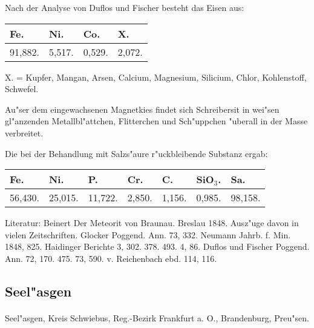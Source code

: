 \documentclass[a4paper, 11pt, oneside]{article}
\begin{document}
Nach der Analyse von Duflos und Fischer besteht das Eisen aus:
\begin{table}[H]
    \centering
    \begin{tabular}{l l l l}
        Fe. & Ni. & Co. & X. \\ \hline
        91,882. & 5,517. & 0,529. & 2,072. \\
    \end{tabular}
\end{table}

X. = Kupfer, Mangan, Arsen, Calcium, Magnesium, Silicium, Chlor, Kohlenstoff, Schwefel.

Au"ser dem eingewachsenen Magnetkies findet sich Schreibersit in wei"sen gl"anzenden Metallbl"attchen, Flitterchen und Sch"uppchen "uberall in der Masse verbreitet.

Die bei der Behandlung mit Salzs"aure r"uckbleibende Substanz ergab:
\begin{table}[H]
    \centering
    \begin{tabular}{l l l l l l l}
        Fe. & Ni. & P. & Cr. & C. & SiO$_{3}$. & Sa. \\ \hline
        56,430. & 25,015. & 11,722. & 2,850. & 1,156. & 0,985. & 98,158. \\
    \end{tabular}
\end{table}

\footnotesize
Literatur: Beinert Der Meteorit von Braunau. Breslau 1848. Ausz"uge davon in vielen Zeitschriften. Glocker Poggend. Ann. 73, 332. Neumann Jahrb. f. Min. 1848, 825. Haidinger Berichte 3, 302. 378. 493. 4, 86. Duflos und Fischer Poggend. Ann. 72, 170. 475. 73, 590. v. Reichenbach ebd. 114, 116.

\subsection{Seel"asgen}
\normalsize
\paragraph{}
Seel"asgen, Kreis Schwiebus, Reg.-Bezirk Frankfurt a. O., Brandenburg, Preu"sen.
\end{document}
